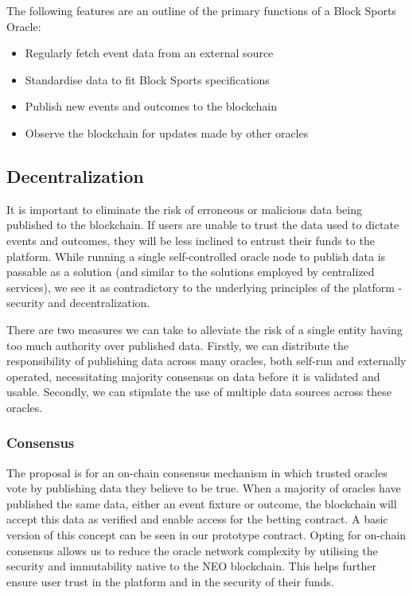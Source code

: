 \documentclass{article}
\begin{document}
The following features are an outline of the primary functions of a Block Sports Oracle:

\begin{itemize}
	\item Regularly fetch event data from an external source
	\item Standardise data to fit Block Sports specifications
	\item Publish new events and outcomes to the blockchain
	\item Observe the blockchain for updates made by other oracles
\end{itemize}

	\subsection{Decentralization} \label{decentralization}
	It is important to eliminate the risk of erroneous or malicious data being published to the blockchain. If users are unable to trust the data used to dictate events and outcomes, they will be less inclined to entrust their funds to the platform. While running a single self-controlled oracle node to publish data is passable as a solution (and similar to the solutions employed by centralized services), we see it as contradictory to the underlying principles of the platform - security and decentralization.

There are two measures we can take to alleviate the risk of a single entity having too much authority over published data. Firstly, we can distribute the responsibility of publishing data across many oracles, both self-run and externally operated, necessitating majority consensus on data before it is validated and usable. Secondly, we can stipulate the use of multiple data sources across these oracles.

		\subsubsection{Consensus} \label{consensus}
The proposal is for an on-chain consensus mechanism in which trusted oracles vote by publishing data they believe to be true. When a majority of oracles have published the same data, either an event fixture or outcome, the blockchain will accept this data as verified and enable access for the betting contract. A basic version of this concept can be seen in our prototype contract. Opting for on-chain consensus allows us to reduce the oracle network complexity by utilising the security and immutability native to the NEO blockchain. This helps further ensure user trust in the platform and in the security of their funds.
\end{document}

